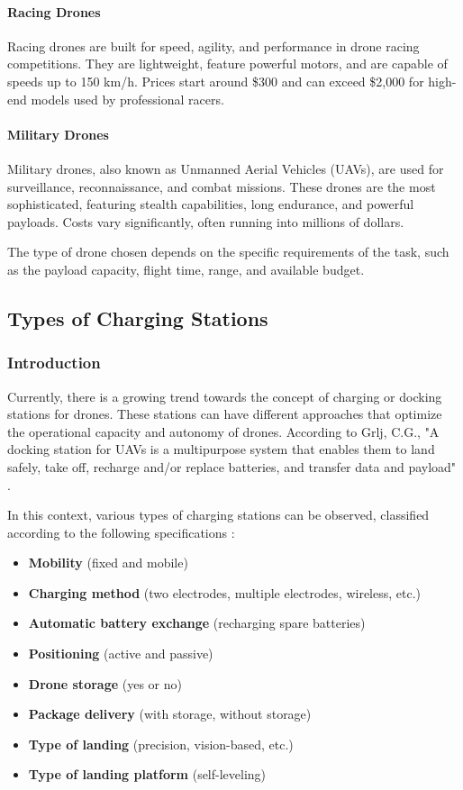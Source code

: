     \paragraph{Racing Drones} Racing drones are built for speed, agility, and performance in drone racing competitions. They are lightweight, feature powerful motors, and are capable of speeds up to 150 km/h. Prices start around \$300 and can exceed \$2,000 for high-end models used by professional racers.
    
    \paragraph{Military Drones} Military drones, also known as Unmanned Aerial Vehicles (UAVs), are used for surveillance, reconnaissance, and combat missions. These drones are the most sophisticated, featuring stealth capabilities, long endurance, and powerful payloads. Costs vary significantly, often running into millions of dollars.
    
    The type of drone chosen depends on the specific requirements of the task, such as the payload capacity, flight time, range, and available budget.

\subsection{Types of Charging Stations}
    \subsubsection{Introduction}
    Currently, there is a growing trend towards the concept of charging or docking stations for drones. These stations can have different approaches that optimize the operational capacity and autonomy of drones. According to Grlj, C.G., "A docking station for UAVs is a multipurpose system that enables them to land safely, take off, recharge and/or replace batteries, and transfer data and payload" \cite{}.

    In this context, various types of charging stations can be observed, classified according to the following specifications \cite{}:

    \begin{itemize}
    \item \textbf{Mobility} (fixed and mobile)
    \item \textbf{Charging method} (two electrodes, multiple electrodes, wireless, etc.)
    \item \textbf{Automatic battery exchange} (recharging spare batteries)
    \item \textbf{Positioning} (active and passive)
    \item \textbf{Drone storage} (yes or no)
    \item \textbf{Package delivery} (with storage, without storage)
    \item \textbf{Type of landing} (precision, vision-based, etc.)
    \item \textbf{Type of landing platform} (self-leveling)
    \end{itemize}

